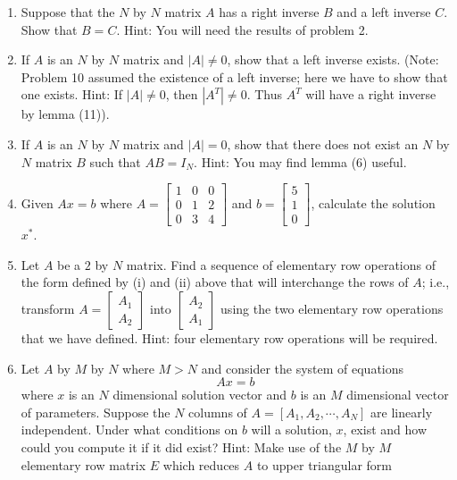 \documentclass[10pt]{article}
\renewcommand{\textit}{}
\begin{document}
\begin{enumerate}
\item \textit{Suppose that the $N$ by $N$ matrix $A$ has a right inverse $B$
    and a left inverse $C$.  Show that $B = C$.  Hint: You will need the
    results of problem 2.} 
\item \textit{If $A$ is an $N$ by $N$ matrix and $|A| \neq 0$, show that a
    left inverse exists.  (Note: Problem 10 assumed the existence of a left
    inverse; here we have to show that one exists.  Hint: If $|A| \neq 0$,
    then $|A^T| \neq 0$.  Thus $A^T$ will have a right inverse by lemma
    (11)).} 
\item \textit{If $A$ is an $N$ by $N$ matrix and $|A| = 0$, show that there
    does not exist an $N$ by $N$ matrix $B$ such that $AB = I_N$.  Hint:
    You may find lemma (6) useful.} 
\item \textit{Given $Ax  =  b$  where   
  $A = \begin{bmatrix}
    1 & 0 & 0 \\
    0 & 1 & 2 \\
    0 & 3 & 4
  \end{bmatrix}$ and $b = \begin{bmatrix} 5 \\ 1 \\ 0 \end{bmatrix}$,
  calculate the solution $x^*$.} 
\item \textit{Let $A$ be a $2$ by $N$ matrix.  Find a sequence of
    elementary row operations of the form defined by (i) and (ii)
    above that will interchange the rows of $A$; i.e., transform $A
    = \begin{bmatrix}
      A_1 \\ A_2 \end{bmatrix}$ into $\begin{bmatrix} A_2 \\
      A_1 \end{bmatrix}$ using the two elementary row operations that
    we have defined.  Hint: four elementary row operations will be
    required.}
\item \textit{Let $A$ by $M$ by $N$ where $M > N $ and consider the
    system of equations}
  \[
  Ax = b
  \]
  \textit{where $x$ is an $N$ dimensional solution vector and $b$ is an $M$
  dimensional vector of parameters.  Suppose the $N$ columns of $A =
  [A_1 ,A_2 ,\cdots,A_N]$ are linearly independent.  Under what
  conditions on $b$ will a solution, $x$, exist and how could you
  compute it if it did exist?  Hint: Make use of the $M$ by $M$
  elementary row matrix $E$ which reduces $A$ to upper triangular form
}
\end{enumerate}
\end{document}
